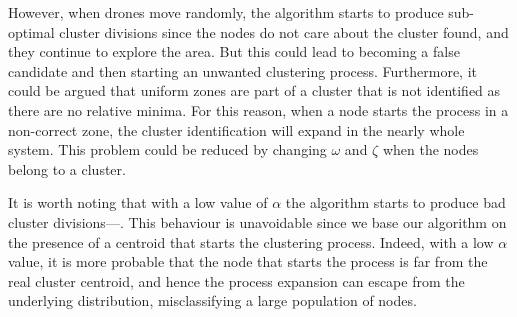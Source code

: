 However, when drones move randomly, the algorithm starts to produce sub-optimal cluster divisions since the nodes do not care about the cluster found,
 and they continue to explore the area.
 But this could lead to becoming a false candidate and then starting an unwanted clustering process.
 Furthermore, it could be argued that uniform zones are part of a cluster that is not identified as there are no relative minima.
 For this reason, when a node starts the process in a non-correct zone, the cluster identification will expand in the nearly whole system.
 This problem could be reduced by changing $\omega$ and $\zeta$ when the nodes belong to a cluster.

It is worth noting that with a low value of $\alpha$ the algorithm starts to produce bad cluster divisions---.
This behaviour is unavoidable since we base our algorithm on the presence of a centroid that starts the clustering process.
Indeed, with a low $\alpha$ value, it is more probable that the node that starts the process is far from the real cluster centroid,
and hence the process expansion can escape from the underlying distribution,
misclassifying a large population of nodes.

